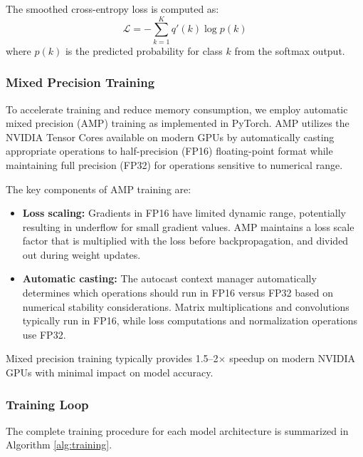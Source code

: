 \documentclass[11pt,a4paper]{article}
\begin{document}
The smoothed cross-entropy loss is computed as:
\begin{equation}
    \mathcal{L} = -\sum_{k=1}^{K} q'(k) \log p(k)
\end{equation}
where $p(k)$ is the predicted probability for class $k$ from the softmax output.

\subsubsection{Mixed Precision Training}

To accelerate training and reduce memory consumption, we employ automatic mixed precision (AMP) training as implemented in PyTorch. AMP utilizes the NVIDIA Tensor Cores available on modern GPUs by automatically casting appropriate operations to half-precision (FP16) floating-point format while maintaining full precision (FP32) for operations sensitive to numerical range.

The key components of AMP training are:
\begin{itemize}
    \item \textbf{Loss scaling:} Gradients in FP16 have limited dynamic range, potentially resulting in underflow for small gradient values. AMP maintains a loss scale factor that is multiplied with the loss before backpropagation, and divided out during weight updates.
    
    \item \textbf{Automatic casting:} The autocast context manager automatically determines which operations should run in FP16 versus FP32 based on numerical stability considerations. Matrix multiplications and convolutions typically run in FP16, while loss computations and normalization operations use FP32.
\end{itemize}

Mixed precision training typically provides 1.5--2$\times$ speedup on modern NVIDIA GPUs with minimal impact on model accuracy.

\subsubsection{Training Loop}

The complete training procedure for each model architecture is summarized in Algorithm \ref{alg:training}.
\end{document}
